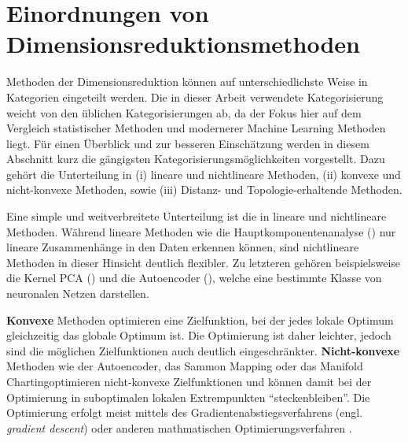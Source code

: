 \section{Einordnungen von Dimensionsreduktionsmethoden}
\label{ch:Dimensionsreduktion:Ansaetze}
Methoden der Dimensionsreduktion können auf unterschiedlichste Weise in Kategorien eingeteilt werden. Die in dieser Arbeit verwendete Kategorisierung weicht von den üblichen Kategorisierungen ab, da der Fokus hier auf dem Vergleich statistischer Methoden und modernerer Machine Learning Methoden liegt. Für einen Überblick und zur besseren Einschätzung werden in diesem Abschnitt kurz die gängigsten Kategorisierungsmöglichkeiten vorgestellt. Dazu gehört die Unterteilung in (i) lineare und nichtlineare Methoden, (ii) konvexe und nicht-konvexe Methoden, sowie (iii) Distanz- und Topologie-erhaltende Methoden.

Eine simple und weitverbreitete Unterteilung ist die in lineare und nichtlineare Methoden. Während
lineare Methoden wie die Hauptkomponentenanalyse ()
nur lineare Zusammenhänge in den Daten erkennen können, sind nichtlineare Methoden in dieser
Hinsicht deutlich flexibler. Zu letzteren gehören beispielsweise die Kernel PCA
() und die Autoencoder
(), welche eine bestimmte Klasse von neuronalen Netzen
darstellen.

\textbf{Konvexe} Methoden optimieren eine Zielfunktion, bei der jedes lokale Optimum gleichzeitig das globale Optimum ist. Die Optimierung ist daher leichter, jedoch sind die möglichen Zielfunktionen auch deutlich eingeschränkter. \textbf{Nicht-konvexe} Methoden wie der Autoencoder, das Sammon Mapping oder das Manifold Charting\addref optimieren nicht-konvexe Zielfunktionen und können damit bei der Optimierung in suboptimalen lokalen Extrempunkten \enquote{steckenbleiben}. Die Optimierung erfolgt meist mittels des Gradientenabstiegsverfahrens (engl. \textit{gradient descent}) oder anderen mathmatischen Optimierungsverfahren \parencite[siehe z.B.][]{Guler.2010}.

